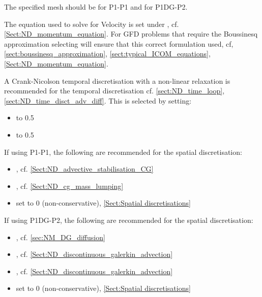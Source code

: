 The specified mesh should be  for P1-P1 and  for P1DG-P2. 

The equation used to solve for Velocity is set under , cf. \ref{Sect:ND_momentum_equation}. For GFD problems that require the Boussinesq approximation selecting  will ensure that this correct formulation used, cf, \ref{sect:boussinesq_approximation}, \ref{sect:typical_ICOM_equations}, \ref{Sect:ND_momentum_equation}.

A Crank-Nicolson temporal discretisation with a non-linear relaxation is recommended for the temporal discretisation cf. \ref{sect:ND_time_loop}, \ref{sect:ND_time_disct_adv_diff}. This is selected by setting:
\begin{itemize}
\item {} to 0.5
\item {} to 0.5
\end{itemize}

If using P1-P1, the following are recommended for the spatial discretisation:
\begin{itemize}
\item {}, cf. \ref{Sect:ND_advective_stabilisation_CG}
\item {}, cf. \ref{Sect:ND_cg_mass_lumping}
\item {} set to 0 (non-conservative), \ref{Sect:Spatial discretisations}
\end{itemize}

If using P1DG-P2, the following are recommended for the spatial discretisation:
\begin{itemize}
\item {}, cf. \ref{sec:NM_DG_diffusion}
\item {}, cf. \ref{Sect:ND_discontinuous_galerkin_advection}
\item {}, cf. \ref{Sect:ND_discontinuous_galerkin_advection}
\item {} set to 0 (non-conservative), \ref{Sect:Spatial discretisations}
\end{itemize}

